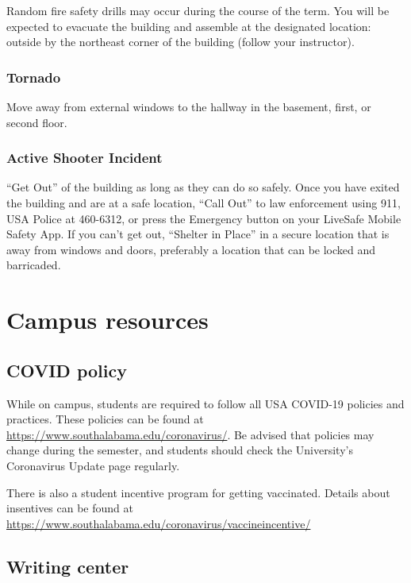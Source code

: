 \documentclass[11pt,]{article}
\begin{document}
Random fire safety drills may occur during the course of the term. You
will be expected to evacuate the building and assemble at the designated
location: outside by the northeast corner of the building (follow your
instructor).

\hypertarget{tornado}{%
\subsubsection{Tornado}\label{tornado}}

Move away from external windows to the hallway in the basement, first,
or second floor.

\hypertarget{active-shooter-incident}{%
\subsubsection{Active Shooter Incident}\label{active-shooter-incident}}

``Get Out'' of the building as long as they can do so safely. Once you
have exited the building and are at a safe location, ``Call Out'' to law
enforcement using 911, USA Police at 460-6312, or press the Emergency
button on your LiveSafe Mobile Safety App. If you can't get out,
``Shelter in Place'' in a secure location that is away from windows and
doors, preferably a location that can be locked and barricaded.

\hypertarget{campus-resources}{%
\section{Campus resources}\label{campus-resources}}

\hypertarget{covid-policy}{%
\subsection{COVID policy}\label{covid-policy}}

While on campus, students are required to follow all USA COVID-19
policies and practices. These policies can be found at
\url{https://www.southalabama.edu/coronavirus/}. Be advised that
policies may change during the semester, and students should check the
University's Coronavirus Update page regularly.

There is also a student incentive program for getting vaccinated.
Details about insentives can be found at
\url{https://www.southalabama.edu/coronavirus/vaccineincentive/}

\hypertarget{writing-center}{%
\subsection{Writing center}\label{writing-center}}
\end{document}
